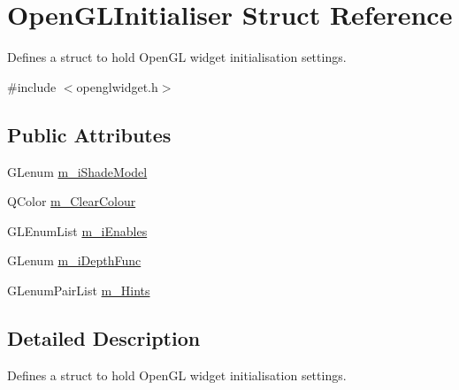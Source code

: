 \hypertarget{struct_open_g_l_initialiser}{\section{Open\-G\-L\-Initialiser Struct Reference}
\label{struct_open_g_l_initialiser}
}


Defines a struct to hold Open\-G\-L widget initialisation settings.  




{\ttfamily \#include $<$openglwidget.\-h$>$}

\subsection*{Public Attributes}
\begin{DoxyCompactItemize}
\item 
G\-Lenum \hyperlink{struct_open_g_l_initialiser_ad2ad4d011d3d4a57faeae733fd065549}{m\-\_\-i\-Shade\-Model}
\item 
Q\-Color \hyperlink{struct_open_g_l_initialiser_a65011f15005795684b97f8900ab39bf6}{m\-\_\-\-Clear\-Colour}
\item 
G\-L\-Enum\-List \hyperlink{struct_open_g_l_initialiser_a4b84e53b0545039933e2428b5a902d2d}{m\-\_\-i\-Enables}
\item 
G\-Lenum \hyperlink{struct_open_g_l_initialiser_a57861877fcf98b47179a46e4800cf0db}{m\-\_\-i\-Depth\-Func}
\item 
G\-Lenum\-Pair\-List \hyperlink{struct_open_g_l_initialiser_a52aff5a3c02a0b30274f95e9d899039d}{m\-\_\-\-Hints}
\end{DoxyCompactItemize}


\subsection{Detailed Description}
Defines a struct to hold Open\-G\-L widget initialisation settings. 

